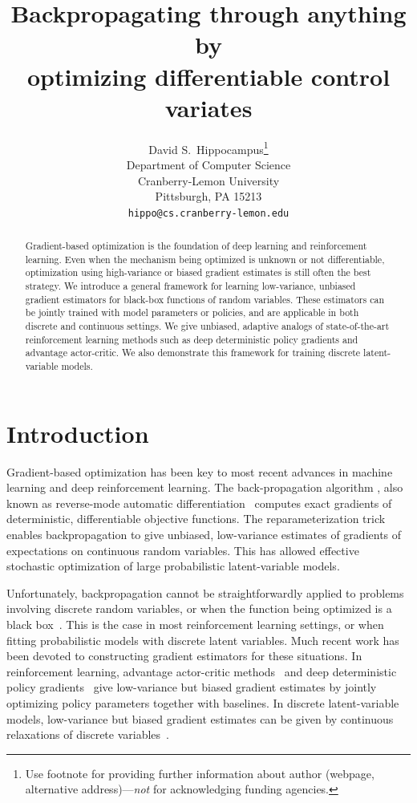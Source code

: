 \documentclass{article}
\title{Backpropagating through anything by\\ optimizing differentiable control variates}
\author{
  David S.~Hippocampus\thanks{Use footnote for providing further
    information about author (webpage, alternative
    address)---\emph{not} for acknowledging funding agencies.} \\
  Department of Computer Science\\
  Cranberry-Lemon University\\
  Pittsburgh, PA 15213 \\
  \texttt{hippo@cs.cranberry-lemon.edu} \\
}
\begin{document}
\maketitle
\begin{abstract}
Gradient-based optimization is the foundation of deep learning and reinforcement learning.
Even when the mechanism being optimized is unknown or not differentiable, optimization using high-variance or biased gradient estimates is still often the best strategy.
We introduce a general framework for learning low-variance, unbiased gradient estimators for black-box functions of random variables.
These estimators can be jointly trained with model parameters or policies, and are applicable in both discrete and continuous settings.
We give unbiased, adaptive analogs of state-of-the-art reinforcement learning methods such as deep deterministic policy gradients and advantage actor-critic.
We also demonstrate this framework for training discrete latent-variable models.
\end{abstract}


\section{Introduction}
Gradient-based optimization has been key to most recent advances in machine learning and deep reinforcement learning.
The back-propagation algorithm \citep{rumelhart1986learning}, also known as reverse-mode automatic differentiation~\citep{speelpenning1980compiling, rall1981automatic} computes exact gradients of deterministic, differentiable objective functions.
The reparameterization trick \citep{kingma2013autoencoding, rezende2014stochastic} enables backpropagation to give unbiased, low-variance estimates of gradients of expectations on continuous random variables.
This has allowed effective stochastic optimization of large probabilistic latent-variable models.

Unfortunately, backpropagation cannot be straightforwardly applied to problems involving discrete random variables, or when the function being optimized is a black box~\citep{schulman2015gradient}.
This is the case in most reinforcement learning settings, or when fitting probabilistic models with discrete latent variables.
Much recent work has been devoted to constructing gradient estimators for these situations.
In reinforcement learning, advantage actor-critic methods~\citep{mnih2016asynchronous} and deep deterministic policy gradients~\citep{lillicrap2015continuous} give low-variance but biased gradient estimates by jointly optimizing policy parameters together with baselines.
In discrete latent-variable models, low-variance but biased gradient estimates can be given by continuous relaxations of discrete variables~\citep{maddison2016concrete, jang2016categorical}.
\end{document}
